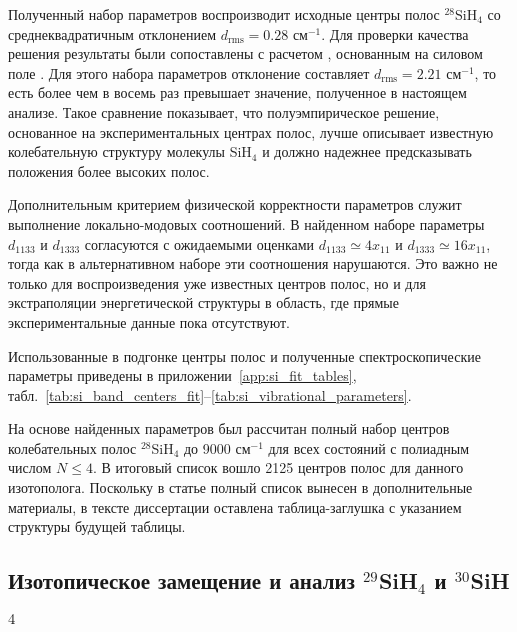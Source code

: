 Полученный набор параметров воспроизводит исходные центры полос ${}^{28}$SiH$_4$ со среднеквадратичным
отклонением $d_{\textrm{rms}}=0.28$ см$^{-1}$. Для проверки качества решения результаты были сопоставлены с
расчетом \cite{wang}, основанным на силовом поле \cite{lee_1}. Для этого набора параметров отклонение
составляет $d_{\textrm{rms}}=2.21$ см$^{-1}$, то есть более чем в восемь раз превышает значение, полученное в
настоящем анализе. Такое сравнение показывает, что полуэмпирическое решение, основанное на
экспериментальных центрах полос, лучше описывает известную колебательную структуру молекулы SiH$_4$ и
должно надежнее предсказывать положения более высоких полос.

Дополнительным критерием физической корректности параметров служит выполнение локально-модовых
соотношений. В найденном наборе параметры $d_{1133}$ и $d_{1333}$ согласуются с ожидаемыми оценками
$d_{1133}\simeq4x_{11}$ и $d_{1333}\simeq16x_{11}$, тогда как в альтернативном наборе \cite{wang} эти
соотношения нарушаются. Это важно не только для воспроизведения уже известных центров полос, но и для
экстраполяции энергетической структуры в область, где прямые экспериментальные данные пока отсутствуют.

Использованные в подгонке центры полос и полученные спектроскопические параметры приведены в
приложении~\ref{app:si_fit_tables}, табл.~\ref{tab:si_band_centers_fit}--\ref{tab:si_vibrational_parameters}.

На основе найденных параметров был рассчитан полный набор центров колебательных полос ${}^{28}$SiH$_4$
до 9000 см$^{-1}$ для всех состояний с полиадным числом $N\leq4$. В итоговый список вошло 2125 центров
полос для данного изотополога. Поскольку в статье полный список вынесен в дополнительные материалы, в
тексте диссертации оставлена таблица-заглушка с указанием структуры будущей таблицы.

\subsection{Изотопическое замещение и анализ ${}^{29}$SiH$_4$ и ${}^{30}$SiH$_4$}


